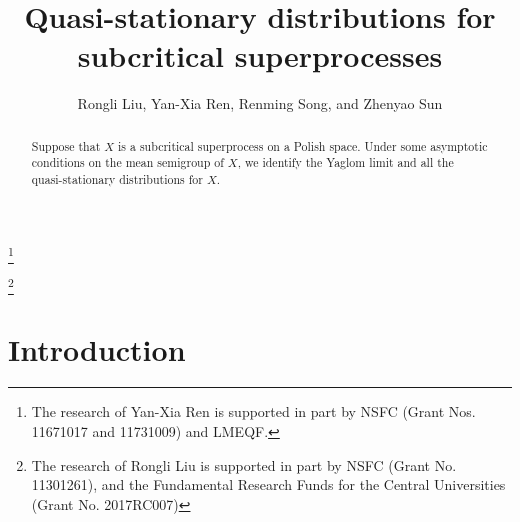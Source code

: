 \documentclass[12pt,a4paper]{amsart}
\numberwithin{equation}{section}
\theoremstyle{plain}
\theoremstyle{definition}
\theoremstyle{remark}
\begin{document}
\title{Quasi-stationary distributions for subcritical superprocesses}
\author[R. Liu, Y.-X. Ren, R. Song, and Z. Sun]{Rongli Liu, Yan-Xia Ren, Renming Song, and Zhenyao Sun}
\address{Yan-Xia Ren\\ LMAM School of Mathematical Sciences \& Center for
Statistical Science\\ Peking University\\ Beijing 100871\\ P. R. China}
\thanks{The research of Yan-Xia Ren is supported in part by NSFC (Grant Nos. 11671017 and 11731009)  and LMEQF.}
\address{Rongli Liu\\ Mathematics and Applied Mathematics\\ Beijing jiaotong University\\ Beijing 100044\\ P. R. China}
\thanks{The research of Rongli Liu is supported in part by NSFC (Grant No. 11301261), and the Fundamental Research Funds for the Central Universities (Grant No.  2017RC007)}
\address{Renming Song\\ Department of Mathematics\\ University of Illinois at Urbana-Champaign \\ Urbana \\ IL 61801\\ USA}
\address{Zhenyao Sun\\ Faculty of Industrial Engineering and Management \\ Technion, Isreal Institute of Technology \\ Haifa 3200003\\ Isreal}
\begin{abstract}
	Suppose that $X$ is a subcritical superprocess on a Polish space. 
	Under some asymptotic conditions on the mean semigroup of $X$, we identify the Yaglom limit and all the quasi-stationary distributions for $X$.
\end{abstract}
\maketitle
\section{Introduction}
\end{document}
